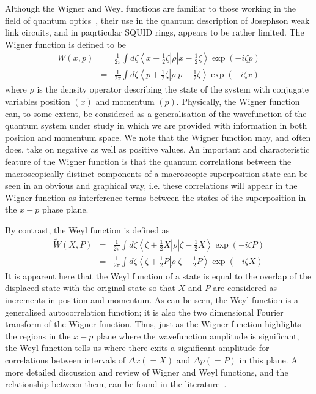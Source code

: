 \documentclass[twocolumn,a4paper,superscriptaddress,showpacs,floatfix,pra]{revtex4}
\begin{document}
Although the Wigner  and Weyl functions are familiar  to those working
in             the             field            of             quantum
optics~\cite{Wigner1932,balazs1984,ChountasisV1998}, their  use in the
quantum description of Josephson weak link circuits, and in paqrticular
SQUID  rings, appears  to be  rather limited.  The Wigner  function is
defined to be
\begin{eqnarray*}
W\left( x,p\right) &=&\frac{1}{2\pi }\int d\zeta \left\langle x+\frac{1}{2}
\zeta \right\vert \rho \left\vert x-\frac{1}{2}\zeta \right\rangle \exp
\left( -i\zeta p\right) \\
&=&\frac{1}{2\pi }\int d\zeta \left\langle p+\frac{1}{2}\zeta \right\vert
\rho \left\vert p-\frac{1}{2}\zeta \right\rangle \exp \left( -i\zeta x\right)
\end{eqnarray*}
where  $\rho $ is  the density  operator describing  the state  of the
system  with  conjugate  variables  position $\left(  x\right)  $  and
momentum $\left(  p\right) $. Physically, the Wigner  function can, to
some extent, be considered as  a generalisation of the wavefunction of
the  quantum  system  under  study  in  which  we  are  provided  with
information  in both  position and  momentum space.  We note  that the
Wigner  function may,  and often  does, take  on negative  as  well as
positive values. An important and characteristic feature of the Wigner
function is that the  quantum correlations between the macroscopically
distinct components  of a macroscopic superposition state  can be seen
in an obvious  and graphical way, i.e. these  correlations will appear
in the Wigner function as interference terms between the states of the
superposition in the $x-p$ phase plane.

By contrast, the Weyl function is defined as 
\begin{eqnarray*}
\tilde{W}\left( X,P\right) &=&\frac{1}{2\pi }\int d\zeta \left\langle \zeta
+ \frac{1}{2}X\right\vert \rho \left\vert \zeta -\frac{1}{2}X\right\rangle
\exp \left( -i\zeta P\right) \\
&=&\frac{1}{2\pi }\int d\zeta \left\langle \zeta +\frac{1}{2}P\right\vert
\rho \left\vert \zeta -\frac{1}{2}P\right\rangle \exp \left( -i\zeta X\right)
\end{eqnarray*}
It is apparent here that the Weyl  function of a state is equal to the
overlap of the displaced state with the original state so that $X$ and
$P$ are considered  as increments in position and  momentum. As can be
seen, the Weyl function  is a generalised autocorrelation function; it
is  also   the  two  dimensional  Fourier  transform   of  the  Wigner
function. Thus, just as the  Wigner function highlights the regions in
the $x-p$  plane where the wavefunction amplitude  is significant, the
Weyl function tells  us where there exits a  significant amplitude for
correlations  between intervals  of  $\Delta x\left(  =X\right) $  and
$\Delta p\left( =P\right) $ in  this plane. A more detailed discussion
and review of Wigner and  Weyl functions, and the relationship between
them,          can          be          found          in          the
literature~\cite{ChountasisV1998,WolfgangS2001}.
\end{document}
